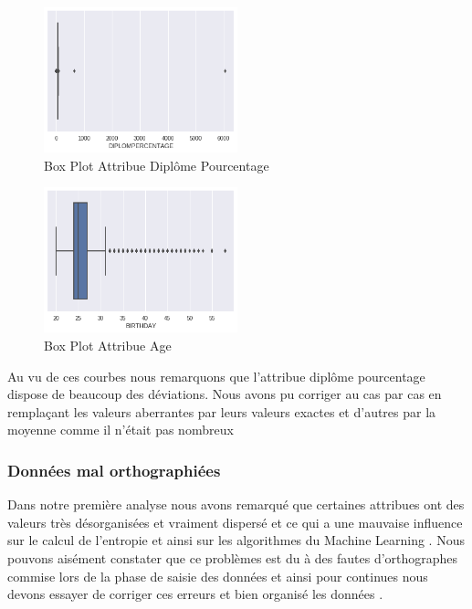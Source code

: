\begin{figure}[ht]
	\centering
	\includegraphics[width=0.5\textwidth]{fig/AGEPlot1.png}
	\caption[Short caption]{Box Plot Attribue Diplôme Pourcentage  }
	\label{fig:AgeBXPlot1}
\end{figure} 

\begin{figure}[ht]
	\centering
	\includegraphics[width=0.5\textwidth]{fig/PercetagePlot.png}
	\caption[Short caption]{Box Plot Attribue  Age  }
	\label{fig:PercBXPlot1}
\end{figure} 
Au vu de ces courbes nous remarquons que l'attribue diplôme pourcentage
dispose de beaucoup des déviations. Nous avons pu corriger au cas par cas en remplaçant les valeurs aberrantes par leurs valeurs exactes et d'autres par la moyenne comme il n'était pas nombreux
\subsubsection{Données mal orthographiées }
Dans notre première analyse nous avons remarqué que certaines  attribues ont des valeurs très désorganisées et vraiment dispersé et ce
qui a une mauvaise influence sur le calcul de l'entropie et ainsi sur
les algorithmes du Machine Learning . Nous pouvons aisément constater
que ce problèmes est du à des fautes d'orthographes commise lors de la
phase de saisie des données et ainsi pour continues nous devons essayer
de corriger ces erreurs et bien organisé les données . 

